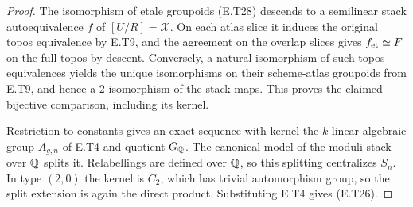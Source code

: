 \begin{proof}
The isomorphism of etale groupoids (E.T28) descends to
a semilinear stack autoequivalence $f$ of
$[U/R]=\mathcal X$.  On each atlas slice it induces
the original topos equivalence by E.T9, and the
agreement on the overlap slices gives
$f_{\rm et}\simeq F$ on the full topos by descent.
Conversely, a natural isomorphism of such topos
equivalences yields the unique isomorphisms on their
scheme-atlas groupoids from E.T9, and hence a
$2$-isomorphism of the stack maps.  This proves the
claimed bijective comparison, including its kernel.

Restriction to constants gives an exact sequence with
kernel the $k$-linear algebraic group $A_{g,n}$ of E.T4
and quotient $G_{\mathbb Q}$.  The canonical model of the
moduli stack over $\mathbb Q$ splits it.  Relabellings are
defined over $\mathbb Q$, so this splitting centralizes $S_n$.
In type $(2,0)$ the kernel is $C_2$, which has trivial
automorphism group, so the split extension is again
the direct product.  Substituting E.T4 gives (E.T26).
\end{proof}
